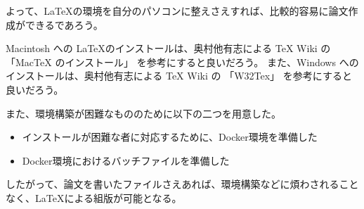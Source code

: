 よって、\LaTeX の環境を自分のパソコンに整えさえすれば、比較的容易に論文作成ができるであろう。

Macintosh への \LaTeX のインストールは、奥村他有志による TeX Wiki の 「MacTeX のインストール」\cite{mactex} を参考にすると良いだろう。
また、Windows へのインストールは、奥村他有志による TeX Wiki の 「W32Tex」\cite{w32tex} を参考にすると良いだろう。

また、環境構築が困難なもののために以下の二つを用意した。
\begin{itemize}
\item インストールが困難な者に対応するために、Docker環境を準備した
\item Docker環境におけるバッチファイルを準備した
\end{itemize}

したがって、論文を書いたファイルさえあれば、環境構築などに煩わされることなく、\LaTeX による組版が可能となる。